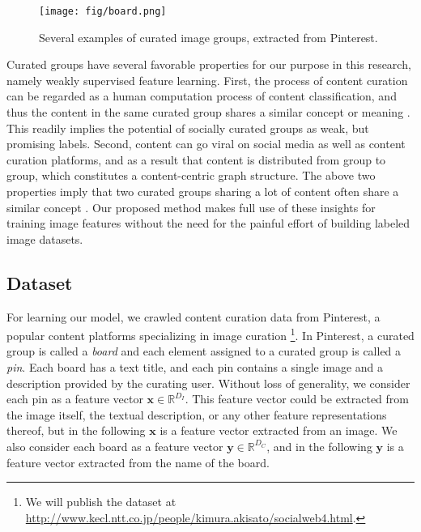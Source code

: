 \documentclass[letterpaper]{article} %
\begin{document}
\begin{figure}
  \begin{center}
    \texttt{[image: fig/board.png]}
  \end{center}
  \caption{Several examples of curated image groups, extracted from Pinterest.}
  \label{fig:board}
\end{figure}

Curated groups have several favorable properties for our purpose in this research, namely weakly supervised feature learning.
%
First, the process of content curation can be regarded as a human computation process of content classification, and thus the content in the same curated group shares a similar concept or meaning \cite{Zhong2015}.
%
This readily implies the potential of socially curated groups as weak, but promising labels.
%
Second, content can go viral on social media as well as content curation platforms, and as a result that content is distributed from group to group, which constitutes a content-centric graph structure.
%
The above two properties imply that two curated groups sharing a lot of content often share a similar concept \cite{Kimura2013}.
%
Our proposed method makes full use of these insights for training image features without the need for the painful effort of building labeled image datasets.

\subsection{Dataset}
\label{sec:curation:data}
\indent

\def\a{\bm{a}}
\def\b{\bm{b}}
\def\s{\bm{s}}
\def\x{\bm{x}}
\def\y{\bm{y}}
\def\z{\bm{z}}
\def\A{\bm{A}}
\def\B{\bm{B}}
\def\V{\bm{V}}
\def\W{\bm{W}}
\def\X{\bm{X}}
\def\Y{\bm{Y}}
\def\Z{\bm{Z}}
\def\bR{\mathbb R}
\def\cC{\mathcal C}
\def\cT{\mathcal T}
\def\cU{\mathcal U}
\def\cL{\mathcal L}

For learning our model, we crawled content curation data from Pinterest, a popular content platforms specializing in image curation \footnote{We will publish the dataset at \url{http://www.kecl.ntt.co.jp/people/kimura.akisato/socialweb4.html}.
}.
%
In Pinterest, a curated group is called a \emph{board} and each element assigned to a curated group is called a \emph{pin}.
%
Each board has a text title, and each pin contains a single image and a description provided by the curating user.
%
Without loss of generality, we consider each pin as a feature vector $\x\in\bR^{D_I}$.
%
This feature vector could be extracted from the image itself, the textual description, or any other feature representations thereof, but in the following $\x$ is a feature vector extracted from an image.
%
We also consider each board as a feature vector $\y\in\bR^{D_C}$, and in the following $\y$ is a feature vector extracted from the name of the board.
\end{document}
